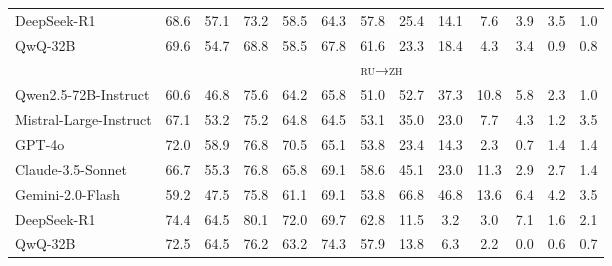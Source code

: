 \documentclass{article}
\theoremstyle{plain}
\theoremstyle{definition}
\theoremstyle{remark}
\newcommand{\ruzhx}{\textsc{ru→zh}}
\begin{document}
\begin{table}[h]
{\begin{tabular}{lcccccccccccc}
    DeepSeek-R1 & 68.6& 57.1& 73.2& 58.5& 64.3& 57.8& 25.4& 14.1& 7.6& 3.9& 3.5& 1.0\\
    QwQ-32B & 69.6 & 54.7 & 68.8 & 58.5 & 67.8 & 61.6 & 23.3 & 18.4 & 4.3 & 3.4 & 0.9 & 0.8\\
    \midrule
    & \multicolumn{12}{c}{\ruzhx} \\
    \cmidrule{2-13}
    Qwen2.5-72B-Instruct &  60.6&  46.8&  75.6&  64.2&  65.8&  51.0&  52.7&  37.3&  10.8&  5.8
&  2.3&  1.0\\
    Mistral-Large-Instruct &  67.1&  53.2&  75.2&  64.8&  64.5&  53.1&  35.0&  23.0&  7.7&  4.3
&  1.2&  3.5\\
    GPT-4o &  72.0&  58.9&  76.8&  70.5&  65.1&  53.8&  23.4&  14.3&  2.3&  0.7
&  1.4&  1.4\\
    Claude-3.5-Sonnet &  66.7&  55.3&  76.8&  65.8&  69.1&  58.6&  45.1&  23.0&  11.3&  2.9
&  2.7&  1.4\\
    Gemini-2.0-Flash &  59.2&  47.5&  75.8&  61.1&  69.1&  53.8&  66.8&  46.8&  13.6&  6.4&  4.2&  3.5\\
    DeepSeek-R1& 74.4& 64.5& 80.1& 72.0& 69.7& 62.8& 11.5& 3.2& 3.0& 7.1& 1.6& 2.1\\
    QwQ-32B & 72.5 & 64.5 & 76.2 & 63.2 & 74.3 & 57.9 & 13.8 & 6.3 & 2.2 & 0.0 & 0.6 & 0.7\\
    \bottomrule
    \end{tabular}
}
\label{tab:data_difficulty_full}
\end{table}
\end{document}
